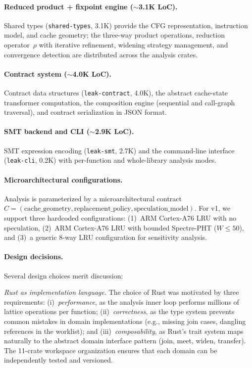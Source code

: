 \documentclass{article}
\theoremstyle{definition}
\theoremstyle{remark}
\begin{document}
\paragraph{Reduced product + fixpoint engine ($\sim$3.1K LoC).}
Shared types (\texttt{shared-types}, 3.1K) provide the CFG representation,
instruction model, and cache geometry; the three-way product operations,
reduction operator~$\rho$ with iterative
refinement, widening strategy management, and convergence detection
are distributed across the analysis crates.

\paragraph{Contract system ($\sim$4.0K LoC).}
Contract data structures (\texttt{leak-contract}, 4.0K), the abstract
cache-state transformer computation,
the composition engine (sequential and call-graph traversal), and contract
serialization in JSON format.

\paragraph{SMT backend and CLI ($\sim$2.9K LoC).}
SMT expression encoding (\texttt{leak-smt}, 2.7K) and the command-line
interface (\texttt{leak-cli}, 0.2K) with per-function and whole-library
analysis modes.

\paragraph{Microarchitectural configurations.}
Analysis is parameterized by a microarchitectural contract
$C = (\text{cache\_geometry}, \text{replacement\_policy},
\text{speculation\_model})$.  For v1, we support three hardcoded configurations:
(1)~ARM Cortex-A76 LRU with no speculation, (2)~ARM Cortex-A76 LRU with bounded
Spectre-PHT ($W \leq 50$), and (3)~a generic 8-way LRU configuration for
sensitivity analysis.

\paragraph{Design decisions.}
Several design choices merit discussion:

\emph{Rust as implementation language.}
The choice of Rust was motivated by three requirements: (i)~\emph{performance},
as the analysis inner loop performs millions of lattice operations per function;
(ii)~\emph{correctness}, as the type system prevents common mistakes in
domain implementations (e.g., missing join cases, dangling references in the
worklist); and (iii)~\emph{composability}, as Rust's trait system maps naturally
to the abstract domain interface pattern (join, meet, widen, transfer).  The
11-crate workspace organization ensures that each domain can be independently
tested and versioned.
\end{document}
